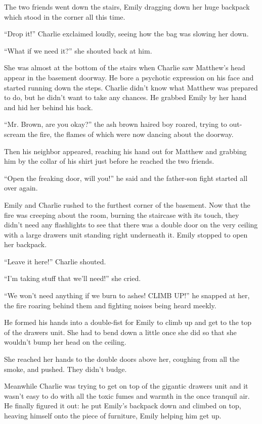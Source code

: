 The two friends went down the stairs, Emily dragging down her huge backpack which stood in the corner all this time.

“Drop it!” Charlie exclaimed loudly, seeing how the bag was slowing her down.

“What if we need it?” she shouted back at him.

She was almost at the bottom of the stairs when Charlie saw Matthew's head appear in the basement doorway. He bore a psychotic expression on his face and started running down the steps. Charlie didn't know what Matthew was prepared to do, but he didn't want to take any chances. He grabbed Emily by her hand and hid her behind his back.

“Mr. Brown, are you okay?” the ash brown haired boy roared, trying to out-scream the fire, the flames of which were now dancing about the doorway.

Then his neighbor appeared, reaching his hand out for Matthew and grabbing him by the collar of his shirt just before he reached the two friends.

“Open the freaking door, will you!” he said and the father-son fight started all over again.

Emily and Charlie rushed to the furthest corner of the basement. Now that the fire was creeping about the room, burning the staircase with its touch, they didn't need any flashlights to see that there was a double door on the very ceiling with a large drawers unit standing right underneath it. Emily stopped to open her backpack.

“Leave it here!” Charlie shouted.

“I'm taking stuff that we'll need!” she cried.

“We won't need anything if we burn to ashes! CLIMB UP!” he snapped at her, the fire roaring behind them and fighting noises being heard meekly.

He formed his hands into a double-fist for Emily to climb up and get to the top of the drawers unit. She had to bend down a little once she did so that she wouldn't bump her head on the ceiling.

She reached her hands to the double doors above her, coughing from all the smoke, and pushed. They didn't budge. 

Meanwhile Charlie was trying to get on top of the gigantic drawers unit and it wasn't easy to do with all the toxic fumes and warmth in the once tranquil air. He finally figured it out: he put Emily's backpack down and climbed on top, heaving himself onto the piece of furniture, Emily helping him get up.

